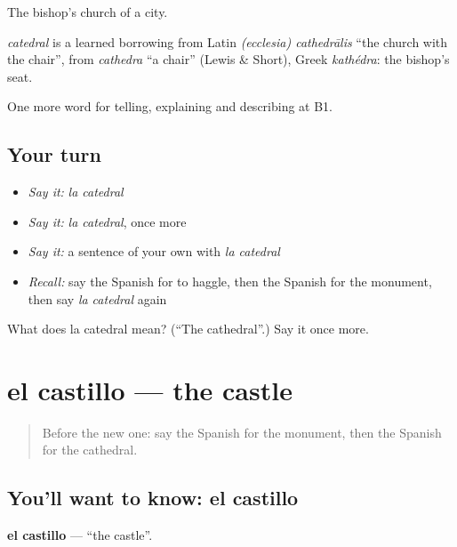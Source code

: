 The bishop’s church of a city.

\begin{cousinweb}
\emph{catedral} is a learned borrowing from Latin \emph{(ecclesia) cathedrālis} \textquotedblleft{}the church with the chair\textquotedblright{}, from \emph{cathedra} \textquotedblleft{}a chair\textquotedblright{} (Lewis \& Short), Greek \emph{kathédra}: the bishop’s seat.
\end{cousinweb}

\begin{grammarlens}[title={What you've built}]
One more word for telling, explaining and describing at B1.
\end{grammarlens}

\subsection*{Your turn}
\begin{itemize}
\raggedright
  \item \emph{Say it:} \emph{la catedral}
  \item \emph{Say it:} \emph{la catedral}, once more
  \item \emph{Say it:} a sentence of your own with \emph{la catedral}
  \item \emph{Recall:} say the Spanish for to haggle, then the Spanish for the monument, then say \emph{la catedral} again
\end{itemize}

\begin{tcolorbox}[breakable,colback=teal!4,colframe=teal!35!black,title={Before you move on}]
What does la catedral mean? (\textquotedblleft{}The cathedral\textquotedblright{}.) Say it once more.
\end{tcolorbox}
\section[el castillo]{el castillo — the castle}

\label{lesson:ES-C677-castillo}



\begin{quote}
Before the new one: say the Spanish for the monument, then the Spanish for the cathedral.
\end{quote}

\subsection*{You'll want to know: el castillo}
\textbf{el castillo} — \textquotedblleft{}the castle\textquotedblright{}.

